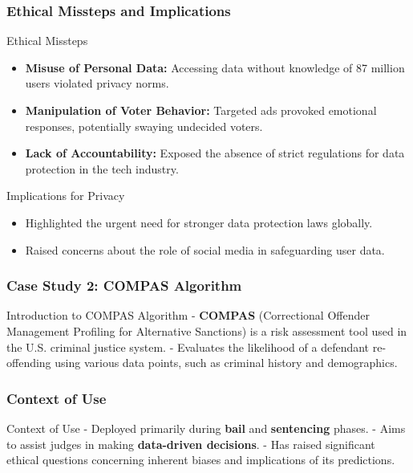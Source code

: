 \documentclass[aspectratio=169]{beamer}
\begin{document}
\begin{frame}[fragile]
    \frametitle{Ethical Missteps and Implications}
    \begin{block}{Ethical Missteps}
        \begin{itemize}
            \item \textbf{Misuse of Personal Data:} Accessing data without knowledge of 87 million users violated privacy norms.
            \item \textbf{Manipulation of Voter Behavior:} Targeted ads provoked emotional responses, potentially swaying undecided voters.
            \item \textbf{Lack of Accountability:} Exposed the absence of strict regulations for data protection in the tech industry.
        \end{itemize}
    \end{block}
        
    \begin{block}{Implications for Privacy}
        \begin{itemize}
            \item Highlighted the urgent need for stronger data protection laws globally.
            \item Raised concerns about the role of social media in safeguarding user data.
        \end{itemize}
    \end{block}
\end{frame}

\begin{frame}[fragile]
    \frametitle{Case Study 2: COMPAS Algorithm}
    \begin{block}{Introduction to COMPAS Algorithm}
        - \textbf{COMPAS} (Correctional Offender Management Profiling for Alternative Sanctions) is a risk assessment tool used in the U.S. criminal justice system.
        - Evaluates the likelihood of a defendant re-offending using various data points, such as criminal history and demographics.
    \end{block}
\end{frame}

\begin{frame}[fragile]
    \frametitle{Context of Use}
    \begin{block}{Context of Use}
        - Deployed primarily during \textbf{bail} and \textbf{sentencing} phases.
        - Aims to assist judges in making \textbf{data-driven decisions}.
        - Has raised significant ethical questions concerning inherent biases and implications of its predictions.
    \end{block}
\end{frame}
\end{document}
